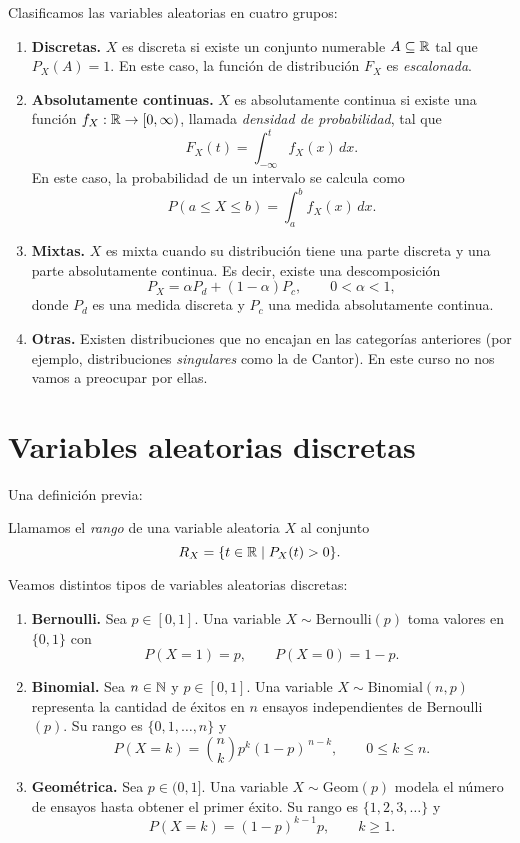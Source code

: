 Clasificamos las variables aleatorias en cuatro grupos:
\begin{enumerate}
    \item \textbf{Discretas.}  
    $X$ es discreta si existe un conjunto numerable $A \subseteq \mathbb{R}$ tal que $P_X(A) = 1$.  
    En este caso, la función de distribución $F_X$ es \emph{escalonada}.

    \item \textbf{Absolutamente continuas.}  
    $X$ es absolutamente continua si existe una función $f_X : \mathbb{R} \to [0,\infty)$, llamada \emph{densidad de probabilidad}, tal que
    \[
        F_X(t) = \int_{-\infty}^{t} f_X(x)\, dx.
    \]
    En este caso, la probabilidad de un intervalo se calcula como
    \[
        P(a \leq X \leq b) = \int_a^b f_X(x)\, dx.
    \]

    \item \textbf{Mixtas.}  
    $X$ es mixta cuando su distribución tiene una parte discreta y una parte absolutamente continua.  
    Es decir, existe una descomposición
    \[
        P_X = \alpha P_d + (1-\alpha) P_c, \qquad 0<\alpha<1,
    \]
    donde $P_d$ es una medida discreta y $P_c$ una medida absolutamente continua.

    \item \textbf{Otras.}  
    Existen distribuciones que no encajan en las categorías anteriores (por ejemplo, distribuciones \emph{singulares} como la de Cantor).  
    En este curso no nos vamos a preocupar por ellas.
\end{enumerate}


\section{Variables aleatorias discretas}

Una definición previa:

\begin{definition}
    Llamamos el \emph{rango} de una variable aleatoria $X$ al conjunto
    \[
        R_X = \{ t \in \mathbb{R} \mid P_X(t) > 0 \}.
    \]
\end{definition}

Veamos distintos tipos de variables aleatorias discretas:

\begin{enumerate}
    \item \textbf{Bernoulli.}  
    Sea $p \in [0,1]$. Una variable $X \sim \mathrm{Bernoulli}(p)$ toma valores en $\{0,1\}$ con
    \[
        P(X=1) = p, \qquad P(X=0) = 1-p.
    \]

    \item \textbf{Binomial.}  
    Sea $n \in \mathbb{N}$ y $p \in [0,1]$. Una variable $X \sim \mathrm{Binomial}(n,p)$ representa la cantidad de éxitos en $n$ ensayos independientes de Bernoulli$(p)$. Su rango es $\{0,1,\ldots,n\}$ y
    \[
        P(X=k) = \binom{n}{k} p^k (1-p)^{\,n-k}, \qquad 0 \leq k \leq n.
    \]

    \item \textbf{Geométrica.}  
    Sea $p \in (0,1]$. Una variable $X \sim \mathrm{Geom}(p)$ modela el número de ensayos hasta obtener el primer éxito. Su rango es $\{1,2,3,\ldots\}$ y
    \[
        P(X=k) = (1-p)^{k-1} p, \qquad k \geq 1.
    \]
\end{enumerate}
